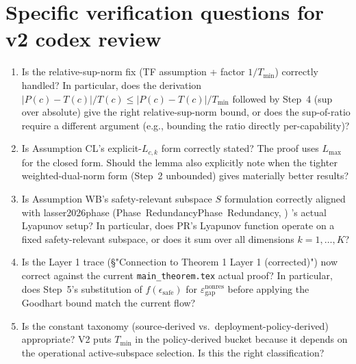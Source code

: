 \documentclass{article}
\makeatletter
\newcommand{\citep}[2][]{%
  \begingroup
  \def\@tmpkey{#2}%
  \ifx\@tmpkey\@empty\else
    (\ifx\@empty#1\@empty\else #1, \fi
     \@nameuse{bibkey@\@tmpkey})%
  \fi
  \endgroup
}
\newcommand{\epsnonres}{\varepsilon_{\mathrm{gap}}^{\mathrm{nonres}}}
\makeatother
\begin{document}
\section{Specific verification questions for v2 codex review}

\begin{enumerate}
\item Is the relative-sup-norm fix (TF assumption + factor
  $1/T_{\min}$) correctly handled? In particular, does the
  derivation $|P(c)-T(c)|/T(c) \leq |P(c)-T(c)|/T_{\min}$ followed
  by Step~4 (sup over absolute) give the right relative-sup-norm
  bound, or does the sup-of-ratio require a different argument
  (e.g., bounding the ratio directly per-capability)?

\item Is Assumption CL's explicit-$L_{c,k}$ form correctly stated?
  The proof uses $L_{\max}$ for the closed form. Should the lemma
  also explicitly note when the tighter weighted-dual-norm form
  (Step~2 unbounded) gives materially better results?

\item Is Assumption WB's safety-relevant subspace $S$ formulation
  correctly aligned with
  \citep[Phase~Redundancy]{lasser2026phase}'s actual Lyapunov
  setup? In particular, does PR's Lyapunov function operate on a
  fixed safety-relevant subspace, or does it sum over all
  dimensions $k = 1, \ldots, K$?

\item Is the Layer 1 trace (\S"Connection to Theorem 1 Layer 1
  (corrected)") now correct against the current
  \texttt{main\_theorem.tex} actual proof? In particular, does
  Step~5's substitution of $f(\epsilon_{\mathrm{safe}})$
  for $\epsnonres$ before applying the Goodhart bound match the
  current flow?

\item Is the constant taxonomy (source-derived vs.\
  deployment-policy-derived) appropriate? V2 puts $T_{\min}$ in
  the policy-derived bucket because it depends on the operational
  active-subspace selection. Is this the right classification?
\end{enumerate}
\end{document}
